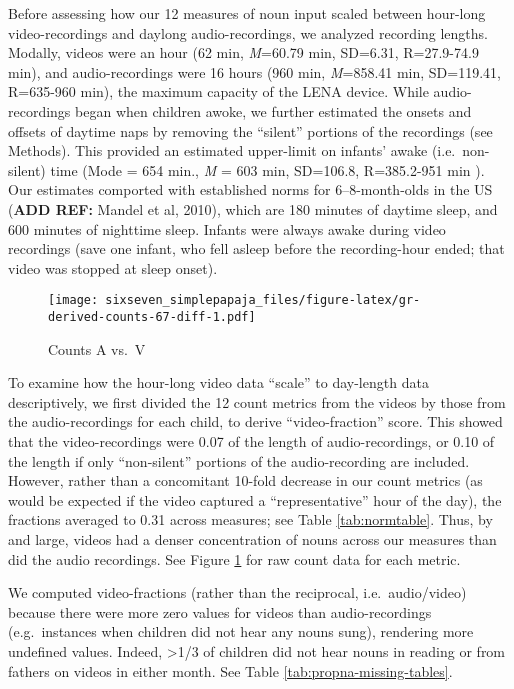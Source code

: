 \documentclass[floatsintext,man]{apa6}
\theoremstyle{definition}
\theoremstyle{definition}
\theoremstyle{definition}
\theoremstyle{remark}
\begin{document}
Before assessing how our 12 measures of noun input scaled between
hour-long video-recordings and daylong audio-recordings, we analyzed
recording lengths. Modally, videos were an hour (62 min, \emph{M}=60.79
min, SD=6.31, R=27.9-74.9 min), and audio-recordings were 16 hours (960
min, \emph{M}=858.41 min, SD=119.41, R=635-960 min), the maximum
capacity of the LENA device. While audio-recordings began when children
awoke, we further estimated the onsets and offsets of daytime naps by
removing the \enquote{silent} portions of the recordings (see Methods).
This provided an estimated upper-limit on infants' awake
(i.e.~non-silent) time (Mode = 654 min., \emph{M} = 603 min, SD=106.8,
R=385.2-951 min ). Our estimates comported with established norms for
6--8-month-olds in the US (\textbf{ADD REF:} Mandel et al, 2010), which
are 180 minutes of daytime sleep, and 600 minutes of nighttime sleep.
Infants were always awake during video recordings (save one infant, who
fell asleep before the recording-hour ended; that video was stopped at
sleep onset).

\begin{figure}
\centering
\texttt{[image: sixseven\_simplepapaja\_files/figure-latex/gr-derived-counts-67-diff-1.pdf]}
\caption{\label{fig:gr-derived-counts-67-diff}Counts A vs.~V}
\end{figure}

To examine how the hour-long video data \enquote{scale} to day-length
data descriptively, we first divided the 12 count metrics from the
videos by those from the audio-recordings for each child, to derive
\enquote{video-fraction} score. This showed that the video-recordings
were 0.07 of the length of audio-recordings, or 0.10 of the length if
only \enquote{non-silent} portions of the audio-recording are included.
However, rather than a concomitant 10-fold decrease in our count metrics
(as would be expected if the video captured a \enquote{representative}
hour of the day), the fractions averaged to 0.31 across measures; see
Table \ref{tab:normtable}. Thus, by and large, videos had a denser
concentration of nouns across our measures than did the audio
recordings. See Figure \ref{fig:gr-derived-counts-67-diff} for raw count
data for each metric.

We computed video-fractions (rather than the reciprocal,
i.e.~audio/video) because there were more zero values for videos than
audio-recordings (e.g.~instances when children did not hear any nouns
sung), rendering more undefined values. Indeed, \textgreater{}1/3 of
children did not hear nouns in reading or from fathers on videos in
either month. See Table \ref{tab:propna-missing-tables}.
\end{document}
